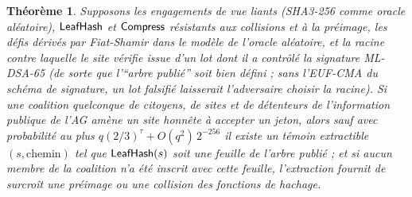 \documentclass[11pt]{article}
\newtheorem{theorem}{Th\'eor\`eme}
\theoremstyle{definition}
\begin{document}
\begin{theorem}
\label{thm:unforge}
Supposons les engagements de vue liants (SHA3-256 comme oracle aléatoire), $\mathsf{LeafHash}$ et
$\mathsf{Compress}$ résistants aux collisions et à la préimage, les défis dérivés par
Fiat-Shamir dans le modèle de l'oracle aléatoire, et la racine contre laquelle le site
vérifie issue d'un lot dont il a contrôlé la signature ML-DSA-65 (de sorte que
l'``arbre publié'' soit bien défini ; sans l'EUF-CMA du schéma de signature, un lot
falsifié laisserait l'adversaire choisir la racine). Si une coalition quelconque de citoyens,
de sites et de détenteurs de l'information publique de l'AG amène un site honnête à
accepter un jeton, alors sauf avec probabilité au plus $q(2/3)^\tau + O(q^2)\,2^{-256}$ il
existe un témoin extractible $(s, \mathrm{chemin})$ tel que $\mathsf{LeafHash}(s)$ soit une
feuille de l'arbre publié ; et si aucun membre de la coalition n'a été inscrit avec cette
feuille, l'extraction fournit de surcroît une préimage ou une collision des fonctions de
hachage.
\end{theorem}
\end{document}
